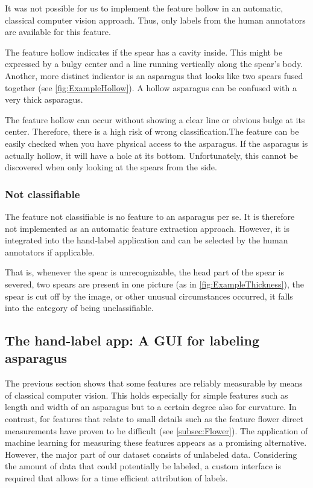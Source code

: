It was not possible for us to implement the feature hollow in an automatic, classical computer vision approach. Thus, only labels from the human annotators are available for this feature.

\bigskip
The feature hollow indicates if the spear has a cavity inside.
This might be expressed by a bulgy center and a line running vertically along the spear’s body. Another, more distinct indicator is an asparagus that looks like two spears fused together (see \autoref{fig:ExampleHollow}). A hollow asparagus can be confused with a very thick asparagus.

The feature hollow can occur without showing a clear line or obvious bulge at its center. Therefore, there is a high risk of wrong classification.The feature can be easily checked when you have physical access to the asparagus. If the asparagus is actually hollow, it will have a hole at its bottom. Unfortunately, this cannot be discovered when only looking at the spears from the side.


\subsubsection{Not classifiable}
\label{subsec:NotClassifiable}

The feature not classifiable is no feature to an asparagus per se. It is therefore not implemented as an automatic feature extraction approach. However, it is integrated into the hand-label application and can be selected by the human annotators if applicable.

That is, whenever the spear is unrecognizable, the head part of the spear is severed, two spears are present in one picture (as in \autoref{fig:ExampleThickness}), the spear is cut off by the image, or other unusual circumstances occurred, it falls into the category of being unclassifiable.


\subsection{The hand-label app: A GUI for labeling asparagus}
\label{sec:LabelApp}

The previous section shows that some features are reliably measurable by means of classical computer vision. This holds especially for simple features such as length and width of an asparagus but to a certain degree also for curvature. In contrast, for features that relate to small details such as the feature flower direct measurements have proven to be difficult (see \autoref{subsec:Flower}). The application of machine learning for measuring these features appears as a promising alternative. 
However, the major part of our dataset consists of unlabeled data. Considering the amount of data that could potentially be labeled, a custom interface is required that allows for a time efficient attribution of labels.


